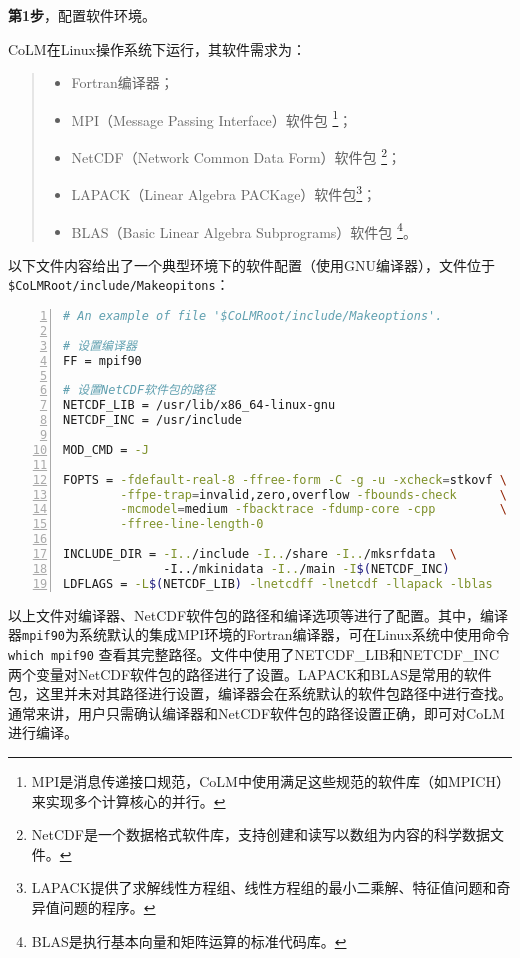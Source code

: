 \textbf{第1步}，配置软件环境。

CoLM在Linux操作系统下运行，其软件需求为：
\begin{quote}
\begin{itemize}
\setlength{\itemsep}{0pt}
\setlength{\parsep}{0pt}
\setlength{\parskip}{0pt}
    \item Fortran编译器；
    \item MPI（Message Passing Interface）软件包 \footnote{MPI是消息传递接口规范，CoLM中使用满足这些规范的软件库（如MPICH）来实现多个计算核心的并行。}；
    \item NetCDF（Network Common Data Form）软件包 \footnote{NetCDF是一个数据格式软件库，支持创建和读写以数组为内容的科学数据文件。}；
    \item LAPACK（Linear Algebra PACKage）软件包\footnote{LAPACK提供了求解线性方程组、线性方程组的最小二乘解、特征值问题和奇异值问题的程序。}；
    \item BLAS（Basic Linear Algebra Subprograms）软件包 \footnote{BLAS是执行基本向量和矩阵运算的标准代码库。}。
\end{itemize}
\end{quote}

以下文件内容给出了一个典型环境下的软件配置（使用GNU编译器），文件位于\texttt{\$CoLMRoot/include/\allowbreak Makeopitons}：
\begin{lstlisting}[language=bash, basicstyle=\linespread{1.2}\footnotesize\ttfamily, commentstyle=\color{black}, numbers=left, numberstyle=\tiny, xleftmargin=1.5em,xrightmargin=0em, aboveskip=1em]
# An example of file '$CoLMRoot/include/Makeoptions'.

# 设置编译器
FF = mpif90

# 设置NetCDF软件包的路径
NETCDF_LIB = /usr/lib/x86_64-linux-gnu
NETCDF_INC = /usr/include

MOD_CMD = -J

FOPTS = -fdefault-real-8 -ffree-form -C -g -u -xcheck=stkovf \
        -ffpe-trap=invalid,zero,overflow -fbounds-check      \
        -mcmodel=medium -fbacktrace -fdump-core -cpp         \
        -ffree-line-length-0

INCLUDE_DIR = -I../include -I../share -I../mksrfdata  \ 
              -I../mkinidata -I../main -I$(NETCDF_INC)
LDFLAGS = -L$(NETCDF_LIB) -lnetcdff -lnetcdf -llapack -lblas

\end{lstlisting}

以上文件对编译器、NetCDF软件包的路径和编译选项等进行了配置。其中，编译器\texttt{mpif90}为系统默认的集成MPI环境的Fortran编译器，可在Linux系统中使用命令 \texttt{which mpif90} 查看其完整路径。文件中使用了NETCDF\_LIB和NETCDF\_INC两个变量对NetCDF软件包的路径进行了设置。LAPACK和BLAS是常用的软件包，这里并未对其路径进行设置，编译器会在系统默认的软件包路径中进行查找。通常来讲，用户只需确认编译器和NetCDF软件包的路径设置正确，即可对CoLM进行编译。

